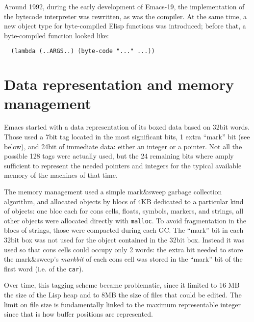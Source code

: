 \documentclass[format=acmsmall, review=false, screen=true]{acmart}
\newcommand \Elisp {Elisp}
\begin{document}
Around 1992, during the early development of Emacs-19, the implementation of
the bytecode interpreter was rewritten, as was the compiler.  At the same
time, a new object type for byte-compiled \Elisp{} functions was introduced;
before that, a byte-compiled function looked like:
\begin{verbatim}
  (lambda (..ARGS..) (byte-code "..." ...))
\end{verbatim}


\section{Data representation and memory management}

Emacs started with a data representation of its boxed data based on 32bit
words.  Those used a 7bit tag located in the most significant bits, 1 extra
``mark'' bit (see below), and 24bit of immediate data: either an integer or
a pointer.  Not all the possible 128 tags were actually used, but the 24
remaining bits where amply sufficient to represent the needed pointers and
integers for the typical available memory of the machines of that time.

The memory management used a simple mark\&sweep garbage collection
algorithm, and allocated objects by blocs of 4KB dedicated to a particular
kind of objects: one bloc each for cons cells, floats, symbols, markers, and
strings, all other objects were allocated directly with \texttt{malloc}.
To avoid fragmentation in the blocs of strings, those were compacted during
each GC.  The ``mark'' bit in each 32bit box was not used for the object
contained in the 32bit box.  Instead it was used so that cons cells could
occupy only 2 words: the extra bit needed to store the mark\&sweep's
\emph{markbit} of each cons cell was stored in the ``mark'' bit of the first
word (i.e. of the \texttt{car}).


Over time, this tagging scheme became problematic, since it limited to 16 MB
the size of the Lisp heap and to 8MB the size of files that could be edited.
The limit on file size is fundamentally linked to the maximum representable
integer since that is how buffer positions are represented.
\end{document}
